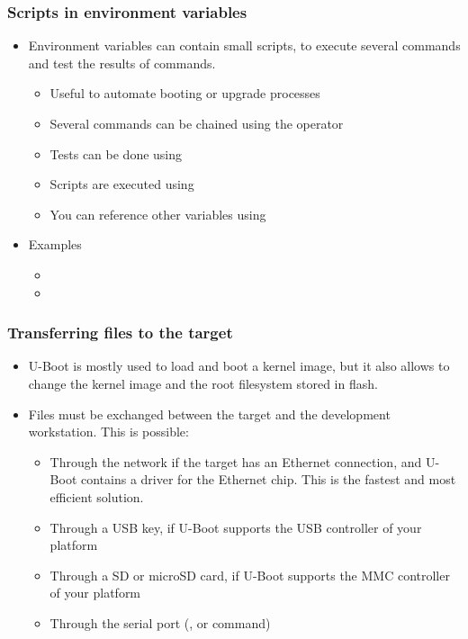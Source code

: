 \begin{frame}
  \frametitle{Scripts in environment variables}
  \begin{itemize}
  \item Environment variables can contain small scripts, to execute
    several commands and test the results of commands.
    \begin{itemize}
    \item Useful to automate booting or upgrade processes
    \item Several commands can be chained using the \code{;} operator
    \item Tests can be done using
    \item Scripts are executed using 
    \item You can reference other variables using
    \end{itemize}
  \item Examples
    \begin{itemize}
    \item {}
    \item {}
  \end{itemize}
\end{itemize}
\end{frame}

\begin{frame}
  \frametitle{Transferring files to the target}
  \begin{itemize}
  \item U-Boot is mostly used to load and boot a kernel image, but it
    also allows to change the kernel image and the root filesystem
    stored in flash.
  \item Files must be exchanged between the target and the development
    workstation. This is possible:
    \begin{itemize}
    \item Through the network if the target has an Ethernet
      connection, and U-Boot contains a driver for the Ethernet
      chip. This is the fastest and most efficient solution.
    \item Through a USB key, if U-Boot supports the USB controller of
      your platform
    \item Through a SD or microSD card, if U-Boot supports the MMC
      controller of your platform
    \item Through the serial port (,  or
       command)
    \end{itemize}
  \end{itemize}
\end{frame}

